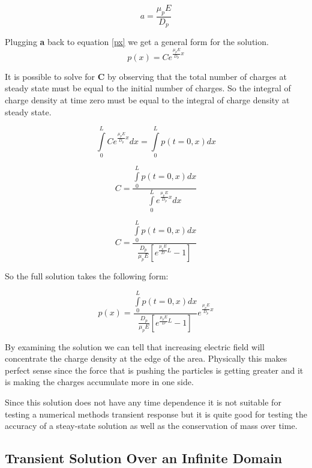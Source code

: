 \begin{equation}
a=\frac{\mu_{p} E}{D_{p}}
\end{equation}

Plugging \textbf{a} back to equation \eqref{px} we get a general form for the solution.
\begin{equation}
p(x)=Ce^{\frac{\mu_{p} E}{D_{p}}x}
\end{equation}

It is possible to solve for \textbf{C} by observing that the total number of charges at steady state must be equal to the initial number of charges. So the integral of charge density at time zero must be equal to the integral of charge density at steady state.


\begin{equation}\nonumber
\int\limits_{0}^{L}Ce^{\frac{\mu_{p} E}{D_{p}}x}dx=\int\limits_{0}^{L}p(t=0,x)dx
\end{equation}

\begin{equation}\nonumber
C=\frac{\int\limits_{0}^{L}p(t=0,x)dx}{\int\limits_{0}^{L}e^{\frac{\mu_{p} E}{D_{p}}x}dx}
\end{equation}

\begin{equation}
C=\frac{\int\limits_{0}^{L}p(t=0,x)dx}{\frac{D_p}{\mu_p E}[e^{\frac{\mu_p E}{D} L} -1]}
\end{equation}

So the full solution takes the following form:

\begin{equation}
p(x)=\frac{\int\limits_{0}^{L}p(t=0,x)dx}{\frac{D_p}{\mu_p E}[e^{\frac{\mu_p E}{D}L} -1]}e^{\frac{\mu_{p} E}{D_{p}}x}
\end{equation}

By examining the solution we can tell that increasing electric field will concentrate the charge density at the edge of the area. Physically this makes perfect sense since the force that is pushing the particles is getting greater and it is making the charges accumulate more in one side. 

Since this solution does not have any time dependence it is not suitable for testing a numerical methods transient response but it is quite good for testing the accuracy of a steay-state solution as well as the conservation of mass over time.


\clearpage
\subsection{Transient Solution Over an Infinite Domain}

